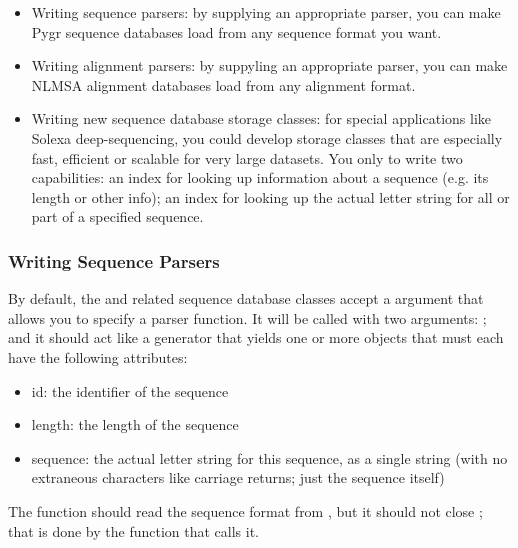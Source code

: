 \documentclass{howto}
\begin{document}
\begin{itemize}
\begin{itemize}
\item Writing sequence parsers: by supplying an appropriate parser,
you can make Pygr sequence databases load from any sequence format you
want.

\item Writing alignment parsers: by suppyling an appropriate parser,
you can make NLMSA alignment databases load from any alignment
format.

\item Writing new sequence database storage classes: for special
applications like Solexa deep-sequencing, you could develop storage
classes that are especially fast, efficient or scalable for very
large datasets.  You only to write two capabilities: an index for
looking up information about a sequence (e.g. its length or other 
info); an index for looking up the actual letter string for all
or part of a specified sequence.
\end{itemize}

\subsubsection{Writing Sequence Parsers}
By default, the  and related sequence
database classes accept a  argument that allows
you to specify a parser function.  It will be called with 
two arguments: ; and it should
act like a generator that yields one or more objects that
must each have the following attributes:
\begin{itemize}
\item id: the identifier of the sequence
\item length: the length of the sequence
\item sequence: the actual letter string for this sequence,
as a single string (with no extraneous characters like carriage
returns; just the sequence itself)
\end{itemize}
The  function should read the sequence format
from , but it should not close ;
that is done by the function that calls it.


\end{itemize}
\end{document}
